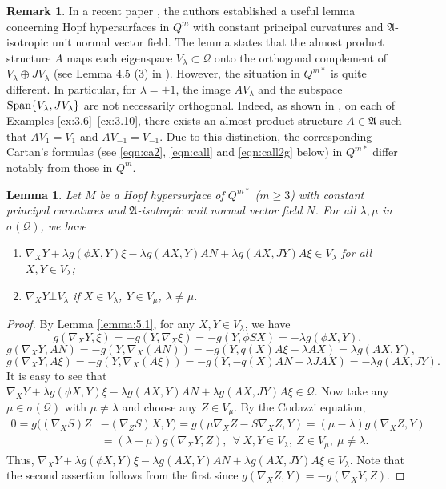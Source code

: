 \documentclass[reqno]{amsart}%
\newtheorem{lemma}[theorem]{Lemma}
\theoremstyle{definition}
\newtheorem{remark}{Remark}[section]
\numberwithin{equation}{section}
\begin{document}
\begin{remark}\label{rem:4.1sss}
In a recent paper \cite{LTY}, the authors established a useful lemma concerning Hopf hypersurfaces in 
$Q^m$ with constant principal curvatures and $\mathfrak{A}$-isotropic unit normal vector field. 
The lemma states that the almost product structure $A$ maps each eigenspace 
$V_{\lambda}\subset \mathcal{Q}$ onto the orthogonal complement of $V_{\lambda}\oplus JV_{\lambda}$ 
(see Lemma 4.5 (3) in \cite{LTY}). However, the situation in $Q^{m*}$ is quite different. In particular, for 
$\lambda=\pm1$, the image $AV_\lambda$ and the subspace ${\rm Span}\{V_\lambda, JV_\lambda\}$  
are not necessarily orthogonal. Indeed, as shown in \cite{B-2023}, on each of Examples \ref{ex:3.6}--\ref{ex:3.10}, there exists an almost product structure $A\in\mathfrak{A}$ 
such that $AV_1=V_1$ and $AV_{-1}=V_{-1}$. Due to this distinction, the corresponding Cartan's formulas (see \eqref{eqn:ca2}, \eqref{eqn:call} and \eqref{eqn:call2g} below) in $Q^{m*}$ differ notably from those in 
$Q^m$.
\end{remark}

\begin{lemma}\label{lemma:5.2}
Let $M$ be a Hopf hypersurface of $Q^{m*}$ ($m\geq3$) with constant principal curvatures and $\mathfrak{A}$-isotropic unit normal vector field $N$. For all $\lambda,\mu$ in $\sigma(\mathcal{Q})$, we have
%
\begin{enumerate}
\item[(1)]
$\nabla_X Y+\lambda g(\phi X,Y)\xi-\lambda g(AX,Y)AN+\lambda g(AX,JY)A\xi\in V_\lambda$ for all $X,Y\in V_\lambda$;

\item[(2)]
$\nabla_X Y\bot V_\lambda$ if $X\in V_\lambda$, $Y\in V_\mu$, $\lambda\neq\mu$.
\end{enumerate}
\end{lemma}
%
\begin{proof}
By Lemma \ref{lemma:5.1}, for any $X,Y\in V_\lambda$, we have
$$
g(\nabla_X Y,\xi)=-g(Y,\nabla_X \xi)=-g(Y,\phi SX)=-\lambda g(\phi X,Y),
$$
$$
g(\nabla_X Y,AN)=-g(Y,\nabla_X (AN))=-g(Y,q(X)A\xi-\lambda AX)=\lambda g(AX,Y),
$$
$$
g(\nabla_X Y,A\xi)=-g(Y,\nabla_X (A\xi))=-g(Y,-q(X)AN-\lambda JAX)=-\lambda g(AX,JY).
$$
It is easy to see that $\nabla_X Y+\lambda g(\phi X,Y)\xi-\lambda g(AX,Y)AN+\lambda g(AX,JY)A\xi\in\mathcal{Q}$.
Now take any $\mu\in \sigma(\mathcal{Q})$ with $\mu\neq\lambda$ and choose any $Z\in V_\mu$.
By the Codazzi equation,
$$
\begin{aligned}
0=g((\nabla_X S)Z&-(\nabla_Z S)X,Y)=g(\mu\nabla_X Z-S\nabla_X Z,Y)=(\mu-\lambda)g(\nabla_X Z,Y)\\
&=(\lambda-\mu)g(\nabla_X Y,Z), \ \ \forall\ X,Y\in V_\lambda, \ Z\in V_\mu, \ \mu\neq\lambda.
\end{aligned}
$$
Thus, $\nabla_X Y+\lambda g(\phi X,Y)\xi-\lambda g(AX,Y)AN+\lambda g(AX,JY)A\xi\in V_\lambda$. Note that
the second assertion follows from the first since $g(\nabla_X Z,Y)=-g(\nabla_X Y,Z)$.
\end{proof}
\end{document}
